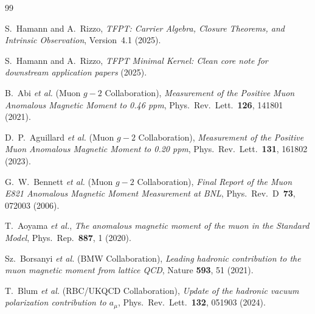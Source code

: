 \documentclass[11pt,a4paper]{article}
\theoremstyle{definition}
\theoremstyle{remark}
\numberwithin{equation}{section}
\begin{document}
\begin{sloppypar}
\begin{thebibliography}{99}

S.~Hamann and A.~Rizzo,
\emph{TFPT: Carrier Algebra, Closure Theorems, and Intrinsic Observation},
Version~4.1 (2025).

S.~Hamann and A.~Rizzo,
\emph{TFPT Minimal Kernel: Clean core note for downstream
application papers} (2025).

B.~Abi \emph{et al.} (Muon $g-2$ Collaboration),
\emph{Measurement of the Positive Muon Anomalous Magnetic Moment to 0.46 ppm},
Phys.\ Rev.\ Lett.\ \textbf{126}, 141801 (2021).

D.~P.~Aguillard \emph{et al.} (Muon $g-2$ Collaboration),
\emph{Measurement of the Positive Muon Anomalous Magnetic Moment to 0.20 ppm},
Phys.\ Rev.\ Lett.\ \textbf{131}, 161802 (2023).

G.~W.~Bennett \emph{et al.} (Muon $g-2$ Collaboration),
\emph{Final Report of the Muon E821 Anomalous Magnetic Moment Measurement at BNL},
Phys.\ Rev.\ D~\textbf{73}, 072003 (2006).

T.~Aoyama \emph{et al.},
\emph{The anomalous magnetic moment of the muon in the Standard Model},
Phys.\ Rep.\ \textbf{887}, 1 (2020).

Sz.~Borsanyi \emph{et al.} (BMW Collaboration),
\emph{Leading hadronic contribution to the muon magnetic moment from lattice QCD},
Nature \textbf{593}, 51 (2021).

T.~Blum \emph{et al.} (RBC/UKQCD Collaboration),
\emph{Update of the hadronic vacuum polarization contribution to $a_\mu$},
Phys.\ Rev.\ Lett.\ \textbf{132}, 051903 (2024).

\end{thebibliography}
\end{sloppypar}
\end{document}

